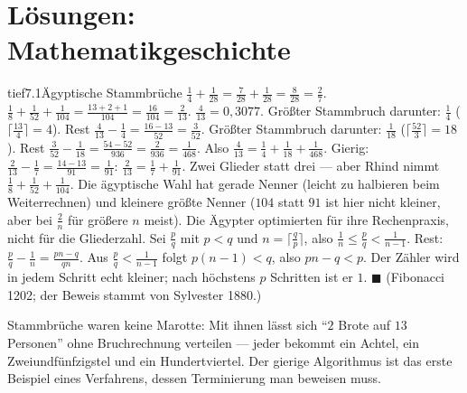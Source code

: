 \chapter[Lösungen: Mathematikgeschichte]{Lösungen:\\Mathematikgeschichte}

\begin{loesungkarte}{tief}{7.1}{Ägyptische Stammbrüche}
$\frac14 + \frac1{28} = \frac7{28} + \frac1{28} = \frac8{28} = \frac27$. \checkmark\ $\frac18 + \frac1{52} + \frac1{104} = \frac{13 + 2 + 1}{104} = \frac{16}{104} = \frac2{13}$. \checkmark
{}
$\frac4{13} = 0{,}3077$. Größter Stammbruch darunter: $\frac14$ ($\lceil\frac{13}4\rceil = 4$). Rest $\frac4{13} - \frac14 = \frac{16 - 13}{52} = \frac3{52}$. Größter Stammbruch darunter: $\frac1{18}$ ($\lceil\frac{52}3\rceil = 18$). Rest $\frac3{52} - \frac1{18} = \frac{54 - 52}{936} = \frac2{936} = \frac1{468}$. Also $\frac4{13} = \frac14 + \frac1{18} + \frac1{468}$.
Gierig: $\frac2{13} - \frac17 = \frac{14 - 13}{91} = \frac1{91}$: $\frac2{13} = \frac17 + \frac1{91}$. Zwei Glieder statt drei --- aber Rhind nimmt $\frac18 + \frac1{52} + \frac1{104}$. Die ägyptische Wahl hat gerade Nenner (leicht zu halbieren beim Weiterrechnen) und kleinere größte Nenner ($104$ statt $91$ ist hier nicht kleiner, aber bei $\frac2{n}$ für größere $n$ meist). Die Ägypter optimierten für ihre Rechenpraxis, nicht für die Gliederzahl.
Sei $\frac pq$ mit $p < q$ und $n = \lceil\frac qp\rceil$, also $\frac1n\le\frac pq < \frac1{n - 1}$. Rest: $\frac pq - \frac1n = \frac{pn - q}{qn}$. Aus $\frac pq < \frac1{n - 1}$ folgt $p(n - 1) < q$, also $pn - q < p$. Der Zähler wird in jedem Schritt echt kleiner; nach höchstens $p$ Schritten ist er $1$. $\blacksquare$ (Fibonacci 1202; der Beweis stammt von Sylvester 1880.)
\begin{mitnehmen}\kastentext
Stammbrüche waren keine Marotte: Mit ihnen lässt sich \enquote{$2$ Brote auf $13$ Personen} ohne Bruchrechnung verteilen --- jeder bekommt ein Achtel, ein Zweiundfünfzigstel und ein Hundertviertel. Der gierige Algorithmus ist das erste Beispiel eines Verfahrens, dessen Terminierung man beweisen muss.
\end{mitnehmen}
\end{loesungkarte}

